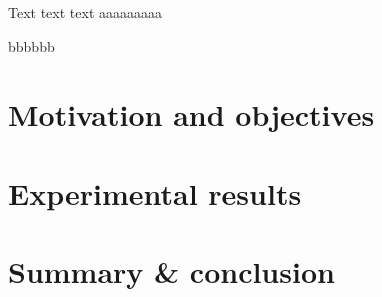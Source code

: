 \documentclass[12pt]{report}
\begin{document}
    Text text text
    aaaaaaaaa


    bbbbbb
    \chapter*{Motivation and objectives}\label{ch:sec1}
    

    \chapter*{Experimental results}\label{ch:sec2}
    

    \chapter*{Summary \& conclusion}\label{ch:sec3}
    
\end{document}
